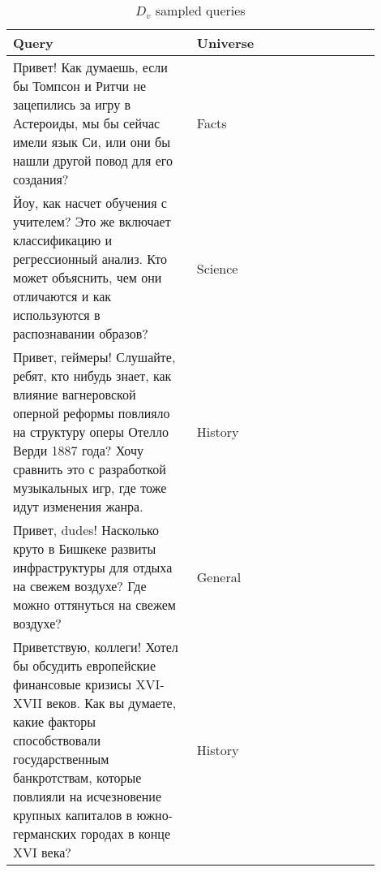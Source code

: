 \begin{table}[ht]
    \centering
    \small
    \caption{$D_v$ sampled queries}
    \label{tab:queries_DV}
    \begin{tabular}{p{0.45\linewidth} p{0.45\linewidth}}
    \toprule
    \textbf{Query} & \textbf{Universe} \\
    \midrule
    Привет! Как думаешь, если бы Томпсон и Ритчи не зацепились за игру в Астероиды, мы бы сейчас имели язык Си, или они бы нашли другой повод для его создания? & Facts \\
    \midrule
    Йоу, как насчет обучения с учителем? Это же включает классификацию и регрессионный анализ. Кто может объяснить, чем они отличаются и как используются в распознавании образов?       & Science \\
    \midrule
    Привет, геймеры! Слушайте, ребят, кто нибудь знает, как влияние вагнеровской оперной реформы повлияло на структуру оперы Отелло Верди 1887 года? Хочу сравнить это с разработкой музыкальных игр, где тоже идут изменения жанра. & History \\
    \midrule
    Привет, dudes! Насколько круто в Бишкеке развиты инфраструктуры для отдыха на свежем воздухе? Где можно оттянуться на свежем воздухе?      & General \\
    \midrule
    Приветствую, коллеги! Хотел бы обсудить европейские финансовые кризисы XVI-XVII веков. Как вы думаете, какие факторы способствовали государственным банкротствам, которые повлияли на исчезновение крупных капиталов в южно-германских городах в конце XVI века?         & History \\
    \bottomrule
    \end{tabular}
\end{table}

